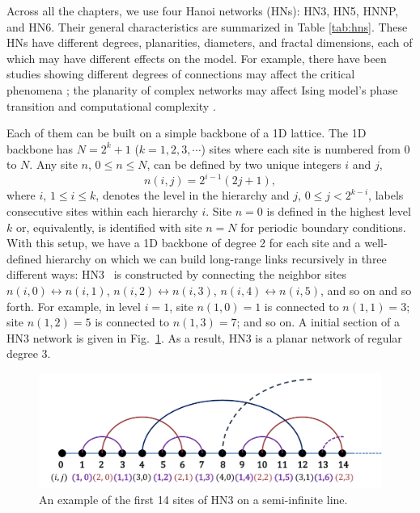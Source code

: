 Across all the chapters, we use four Hanoi networks (HNs): HN3, HN5, HNNP, and HN6. Their general characteristics are summarized in Table \ref{tab:hns}. These HNs have different degrees, planarities, diameters, and fractal dimensions, each of which may have different effects on the model. For example, there have been studies showing different degrees of connections may affect the critical phenomena \cite{dorogovtsev2008critical, herrero2002ising}; the planarity of complex networks may affect Ising model's phase transition \cite{fisher1966dimer, istrail2000statistical} and computational complexity \cite{barahona1982}.


Each of them can be built on
a simple backbone of a 1D lattice. The 1D backbone has $N=2^{k}+1$
($k=1,2,3,\cdots$) sites where each site is numbered from $0$ to
$N$. Any site $n$, $0\le n\le N$, can be defined by two unique
integers $i$ and $j$, 
\begin{equation}
n(i,j)=2^{i-1}(2j+1),\label{eq:numbering}
\end{equation}
where $i$, $1\le i\le k$, denotes the level in the hierarchy and
$j$, $0\le j<2^{k-i}$, labels consecutive sites within each
hierarchy $i$. Site $n=0$ is defined in the highest level $k$ or,
equivalently, is identified with site $n=N$ for periodic boundary
conditions. With this setup, we have a 1D backbone of degree
2 for each site and a well-defined hierarchy on which we can build
long-range links recursively in three different ways: HN3~\cite{Boettcher2008HN}
is constructed by connecting the neighbor sites $n(i,0)\longleftrightarrow n(i,1)$,
$n(i,2)\longleftrightarrow n(i,3)$, $n(i,4)\longleftrightarrow n(i,5)$,
and so on and so forth. For example, in level $i=1$, site $n(1,0)=1$
is connected to $n(1,1)=3$; site $n(1,2)=5$ is connected to $n(1,3)=7$;
and so on. A initial section of a HN3 network is given in Fig.~\ref{fig:HN3_short}.
As a result, HN3 is a planar network of regular degree 3.

\begin{figure}
\centering \includegraphics[width=1\columnwidth]{Chapter-1/HN3_short.pdf} 
\protect\caption{\label{fig:HN3_short} An example of the first 14 sites of HN3 on a semi-infinite line.}
\end{figure}


